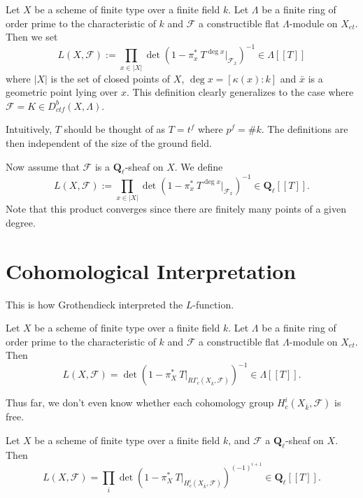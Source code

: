\begin{definition}
Let $X$ be a scheme of finite type over a finite field $k$. Let $\Lambda$ be a
finite ring of order prime to the characteristic of $k$ and $\mathcal{F}$ a
constructible flat $\Lambda$-module on $X_{et}$. Then we set
$$
L(X, \mathcal{F}) := \prod_{x\in |X|}\det\left(1-\pi_x^*\ T^{\deg
x}\Big|_{\mathcal{F}_{\bar x}}\right)^{-1}\in \Lambda [[ T ]]
$$
where $|X|$ is the set of closed points of $X$, $\deg x = [\kappa(x): k]$ and
$\bar x$ is a geometric point lying over $x$. This definition clearly
generalizes to the case where $\mathcal{F} =K \in D_{ctf}^b(X, \Lambda)$.

\begin{remark}
Intuitively, $T$ should be thought of as $T = t^f$ where $p^f = \# k$. The
definitions are then independent of the size of the ground field.
\end{remark}

Now assume that $\mathcal{F}$ is a $\mathbf{Q}_\ell$-sheaf on $X$. We define
$$
L(X, \mathcal{F}) := \prod_{x\in |X|}\det\left(1-\pi_x^*\ T^{\deg
x}\Big|_{\mathcal{F}_{\bar x}}\right)^{-1}\in \mathbf{Q}_\ell [[ T ]].
$$
Note that this product converges since there are finitely many points of a
given degree.
\end{definition}

\section{Cohomological Interpretation}

This is how Grothendieck interpreted the $L$-function.

\begin{theorem} \label{thmA}
Let $X$ be a scheme of finite type over a finite field $k$. Let $\Lambda$ be a
finite ring of order prime to the characteristic of $k$ and $\mathcal{F}$ a
constructible flat $\Lambda$-module on $X_{et}$. Then
$$
L(X, \mathcal{F}) = \det\left(1-\pi_X^*\ T\Big|_{R\Gamma_c(X_{\bar k},
\mathcal{F})}\right)^{-1}\in \Lambda[[ T]].
$$
\end{theorem}

Thus far, we don't even know whether each cohomology group $H^i_c(X_{\bar k},
\mathcal{F})$ is free.

\begin{theorem} \label{thmB}
Let $X$ be a scheme of finite type over a finite field $k$, and $\mathcal{F}$ a
$\mathbf{Q}_\ell$-sheaf on $X$. Then
$$
L(X, \mathcal{F}) = \prod_i \det\left(1-\pi_X^*\
T\Big|_{H_c^i\left(X_{\bar k} , \mathcal{F}\right)}\right)^{(-1)^{i+1}}
\in \mathbf{Q}_\ell[[ T]].
$$
\end{theorem}

